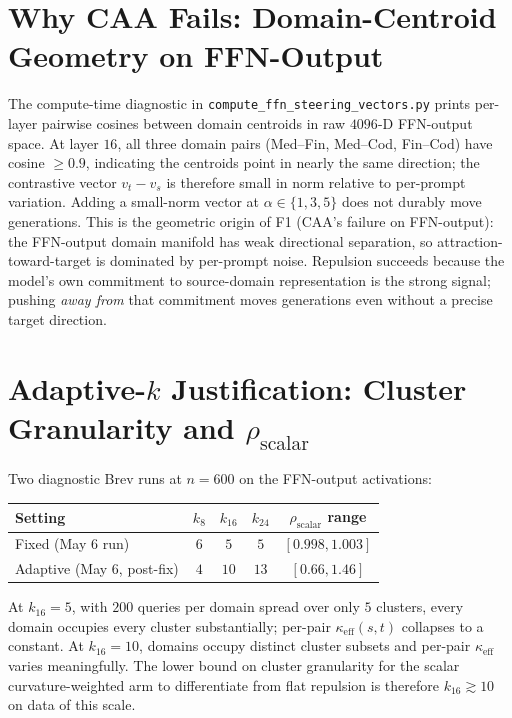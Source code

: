 \documentclass[10pt,twocolumn]{article}
\begin{document}
\section{Why CAA Fails: Domain-Centroid Geometry on FFN-Output}
\label{app:caa}

The compute-time diagnostic in \texttt{compute\_ffn\_steering\_vectors.py} prints per-layer pairwise cosines between domain centroids in raw $4096$-D FFN-output space. At layer $16$, all three domain pairs (Med--Fin, Med--Cod, Fin--Cod) have cosine $\geq 0.9$, indicating the centroids point in nearly the same direction; the contrastive vector $v_t-v_s$ is therefore small in norm relative to per-prompt variation. Adding a small-norm vector at $\alpha\in\{1,3,5\}$ does not durably move generations. This is the geometric origin of F1 (CAA's failure on FFN-output): the FFN-output domain manifold has weak directional separation, so attraction-toward-target is dominated by per-prompt noise. Repulsion succeeds because the model's own commitment to source-domain representation is the strong signal; pushing \emph{away from} that commitment moves generations even without a precise target direction.

\section{Adaptive-$k$ Justification: Cluster Granularity and $\rho_{\text{scalar}}$}
\label{app:k-sweep}

Two diagnostic Brev runs at $n{=}600$ on the FFN-output activations:

\begin{center}\small
\begin{tabular}{lcccc}
\toprule
Setting & $k_8$ & $k_{16}$ & $k_{24}$ & $\rho_{\text{scalar}}$ range \\
\midrule
Fixed (May 6 run) & $6$ & $5$ & $5$ & $[0.998, 1.003]$ \\
Adaptive (May 6, post-fix) & $4$ & $10$ & $13$ & $[0.66, 1.46]$ \\
\bottomrule
\end{tabular}
\end{center}

At $k_{16}{=}5$, with $200$ queries per domain spread over only $5$ clusters, every domain occupies every cluster substantially; per-pair $\kappa_{\text{eff}}(s,t)$ collapses to a constant. At $k_{16}{=}10$, domains occupy distinct cluster subsets and per-pair $\kappa_{\text{eff}}$ varies meaningfully. The lower bound on cluster granularity for the scalar curvature-weighted arm to differentiate from flat repulsion is therefore $k_{16}\gtrsim 10$ on data of this scale.
\end{document}
